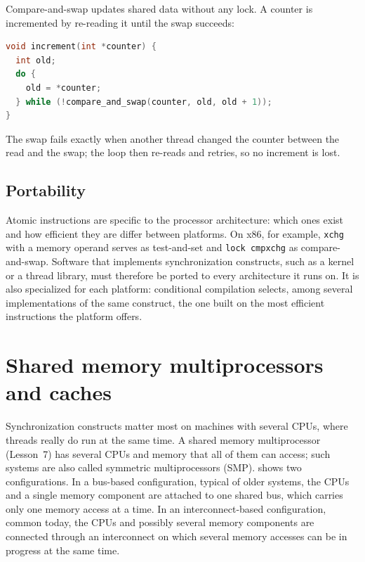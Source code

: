 \documentclass[../main.tex]{subfiles}
\begin{document}
\begin{example}
  Compare-and-swap updates shared data without any lock.  A counter is
  incremented by re-reading it until the swap succeeds:
  \begin{lstlisting}[language=C, numbers=none]
void increment(int *counter) {
  int old;
  do {
    old = *counter;
  } while (!compare_and_swap(counter, old, old + 1));
}
\end{lstlisting}
  The swap fails exactly when another thread changed the
  counter between the read and the swap; the
  loop then re-reads and retries, so no increment is lost.
\end{example}

\subsection{Portability}

Atomic instructions are specific to the processor architecture: which ones
exist and how efficient they are differ between platforms.  On x86, for
example, \texttt{xchg} with a memory operand serves as test-and-set and
\texttt{lock cmpxchg} as compare-and-swap.  Software that implements
synchronization constructs, such as a kernel or a thread library, must
therefore be ported to every architecture it runs on.  It is also
specialized for each platform: conditional compilation selects, among
several implementations of the same construct, the one built on the most
efficient instructions the platform offers.

\section{Shared memory multiprocessors and caches}
\label{sec:l10-smp}

Synchronization constructs matter most on machines with several CPUs,
where threads really do run at the same time.  A shared memory multiprocessor
(Lesson~7) has several CPUs and memory
that all of them can access; such systems are also called symmetric
multiprocessors (SMP).   shows two configurations.  In a
bus-based configuration, typical of older systems, the CPUs and a single
memory component are attached to one shared bus, which carries only one
memory access at a time.  In an interconnect-based configuration, common
today, the CPUs and possibly several memory components are connected
through an interconnect on which several memory accesses can be in
progress at the same time.
\end{document}
